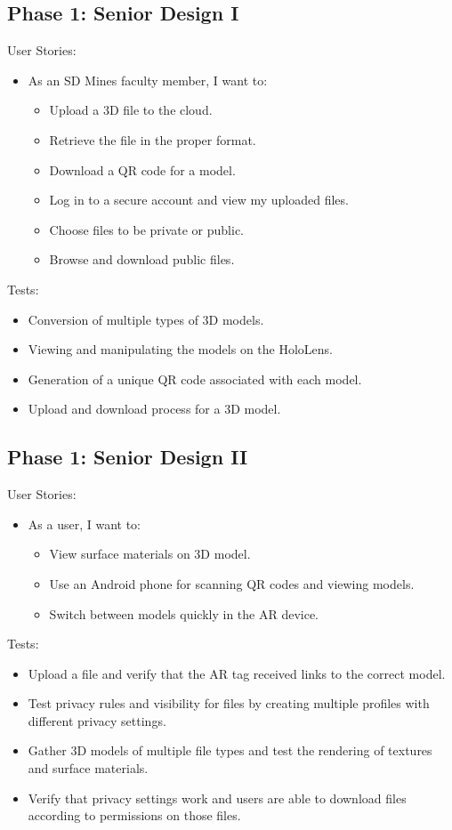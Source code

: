 \subsection{Phase 1: Senior Design I}

User Stories:
\begin{itemize}
	\item As an SD Mines faculty member, I want to:
		\begin{itemize}
			\item Upload a 3D file to the cloud.
			\item Retrieve the file in the proper format.
			\item Download a QR code for a model.
			\item Log in to a secure account and view my uploaded files.
			\item Choose files to be private or public.
			\item Browse and download public files.
		\end{itemize}
\end{itemize}
Tests:
\begin{itemize}
	\item Conversion of multiple types of 3D models.
	\item Viewing and manipulating the models on the HoloLens.
	\item Generation of a unique QR code associated with each model.
	\item Upload and download process for a 3D model.
\end{itemize}

\subsection{Phase 1: Senior Design II}

User Stories:
\begin{itemize}
	\item As a user, I want to:
	\begin{itemize}
		\item View surface materials on 3D model.
		\item Use an Android phone for scanning QR codes and viewing models.
		\item Switch between models quickly in the AR device.
	\end{itemize}
\end{itemize}
Tests:
\begin{itemize}
	\item Upload a file and verify that the AR tag received links to the correct
	model.
	\item Test privacy rules and visibility for files by creating multiple 
	profiles with different privacy settings.
	\item Gather 3D models of multiple file types and test the rendering of 
	textures and surface materials.
	\item Verify that privacy settings work and users are able to download files
	according to permissions on those files.
\end{itemize}